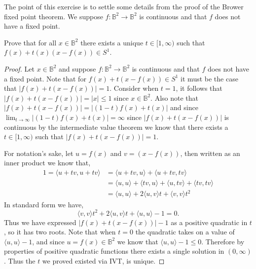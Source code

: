 \documentclass{homework651}
\newcommand{\bbB}{\mathbb{B}}
\begin{document}
\begin{problems}

\problem The point of this exercise is to settle some details from the 
proof of the Brower fixed point theorem.  We suppose $f:\bbB^2 \to \bbB^2 $ is
continuous and that $f$ does not have a fixed point.
\begin{subproblems}
\item Prove that for all $x\in \bbB^2$ there exists a unique
$t\in[1,\infty)$ such that $f(x)+t(x)(x-f(x))\in S^1$.
\begin{proof} Let $x \in \bbB^2$ and suppose $f:\bbB^2 \to \bbB^2$ is
    continuous and that $f$ does not have a fixed point. Note that for 
    $f(x)+t(x-f(x))\in S^1$ it must be the case that $|f(x)+t(x-f(x))| = 1$. 
Consider when $t = 1$, it follows that $|f(x)+t(x-f(x))| = |x| \leq 1$ since $x \in \bbB^2$. 
Also note that $|f(x)+t(x-f(x))| = |(1 - t)f(x) + t(x)|$ and since $\lim_{t \to \infty}|(1 - t)f(x) + t(x)| = \infty$
since $|f(x)+t(x-f(x))|$ is continuous by the intermediate value theorem we know that there exists a $t \in [1, \infty)$ such that $|f(x)+t(x-f(x))| = 1$.

For notation's sake, let $u = f(x)$ and $v = (x - f(x))$, then written as an inner product we know that, 
    \begin{align*}
   1 =  \langle u + tv, u + tv\rangle &= \langle u + tv, u\rangle + \langle u + tv, tv\rangle\\
    &= \langle u , u\rangle + \langle tv, u\rangle  + \langle u, tv\rangle + \langle tv, tv\rangle  \\
    &= \langle u,u\rangle + 2\langle u, v\rangle t + \langle v, v\rangle t^2  
\end{align*}
In standard form we have, 
\begin{equation*}
  \langle v, v\rangle t^2+ 2\langle u, v\rangle t + \langle u,u\rangle - 1 = 0.
\end{equation*}
Thus we have expressed $|f(x)+t(x-f(x))| - 1$ as a positive quadratic in $t$, so it has two roots.
Note that when $t = 0$ the quadratic takes on a value of  $\langle u,u\rangle - 1$, and since $u = f(x) \in \bbB^2$
we know that $\langle u,u\rangle - 1\leq 0$. Therefore by properties of positive quadratic functions there exists a single solution in $(0, \infty)$. Thus the $t$ we proved existed via IVT, 
is unique. 
\end{proof}




\end{subproblems}
\end{problems}
\end{document}
